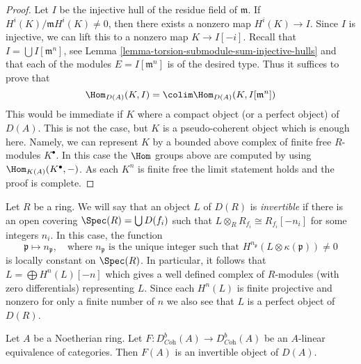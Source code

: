 \begin{proof}
Let $I$ be the injective hull of the residue field of $\mathfrak m$.
If $H^i(K)/\mathfrak m H^i(K) \not = 0$, then there exists a nonzero
map $H^i(K) \to I$. Since $I$ is injective, we can lift this to a
nonzero map $K \to I[-i]$. Recall that $I = \bigcup I[\mathfrak m^n]$,
see Lemma \ref{lemma-torsion-submodule-sum-injective-hulls}
and that each of the modules $E = I[\mathfrak m^n]$ is of the
desired type. Thus it suffices to prove that
$$
\Hom_{D(A)}(K, I) = \colim \Hom_{D(A)}(K, I[\mathfrak m^n])
$$
This would be immediate if $K$ where a compact object
(or a perfect object) of $D(A)$. This is not the case, but
$K$ is a pseudo-coherent object which is enough here. Namely,
we can represent $K$ by a bounded above complex of finite
free $R$-modules $K^\bullet$. In this case the $\Hom$ groups
above are computed by using $\Hom_{K(A)}(K^\bullet, -)$.
As each $K^n$ is finite free the limit statement holds and the
proof is complete.
\end{proof}

\noindent
Let $R$ be a ring. We will say that an object $L$ of $D(R)$ is
{\it invertible} if there is an open covering $\Spec(R) = \bigcup D(f_i)$
such that $L \otimes_R R_{f_i} \cong R_{f_i}[-n_i]$ for some integers $n_i$.
In this case, the function
$$
\mathfrak p \mapsto n_\mathfrak p,\quad
\text{where }n_\mathfrak p\text{ is the unique integer such that }
H^{n_\mathfrak p}(L \otimes \kappa(\mathfrak p)) \not = 0
$$
is locally constant on $\Spec(R)$. In particular, it follows that
$L = \bigoplus H^n(L)[-n]$ which gives a well defined complex of
$R$-modules (with zero differentials) representing $L$. Since each
$H^n(L)$ is finite projective and nonzero for only a finite number of
$n$ we also see that $L$ is a perfect object of $D(R)$.

\begin{lemma}
\label{lemma-equivalence-comes-from-invertible}
Let $A$ be a Noetherian ring. Let
$F : D^b_{\textit{Coh}}(A) \to D^b_{\textit{Coh}}(A)$ be an $A$-linear
equivalence of categories. Then $F(A)$ is an invertible object of $D(A)$.
\end{lemma}

